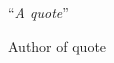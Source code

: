 \documentclass[
11pt, %
english, %
singlespacing, %
headsepline, %
]{MastersDoctoralThesis} %
\begin{document}

%
% 
% 

\cleardoublepage


\vspace*{0.2\textheight}

\noindent\enquote{\itshape A quote}\bigbreak

\hfill Author of quote
\end{document}
